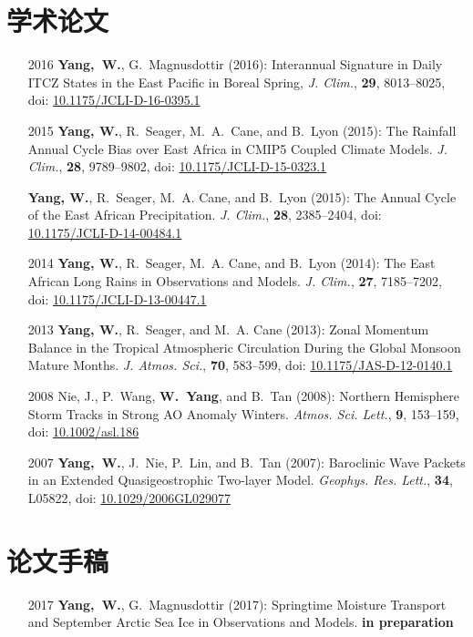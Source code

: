 \documentclass[11pt]{article}
\newcommand{\doi}[1]{ doi: \href{https://doi.org/#1}{#1} }
\begin{document}
\begin{CJK*}{UTF8}{gkai}
\section{学术论文}
\begin{itemize}[leftmargin=10ex,label={}, noitemsep, nolistsep]
	\item[2016] \textbf{Yang,~W.}, G.~Magnusdottir (2016): Interannual Signature in Daily ITCZ States in the East Pacific in Boreal Spring, \newblock \emph{J. Clim.},  \textbf{29}, 8013--8025, \doi{10.1175/JCLI-D-16-0395.1}
	
	\item[2015] \textbf{Yang, W.}, R.~Seager, M.~A.~Cane, and B.~Lyon (2015): The Rainfall Annual Cycle Bias over East Africa in CMIP5 Coupled Climate Models.
\newblock \emph{J. Clim.}, \textbf{28}, 9789--9802, \doi{10.1175/JCLI-D-15-0323.1}

	\item[] \textbf{Yang, W.}, R.~Seager, M.~A. Cane, and B.~Lyon (2015): The Annual Cycle of the
  East African Precipitation.
\newblock \emph{J. Clim.}, \textbf{28}, 2385--2404, \doi {10.1175/JCLI-D-14-00484.1}

	\item[2014] \textbf{Yang, W.}, R.~Seager, M.~A. Cane, and B.~Lyon (2014): The East African Long
  Rains in Observations and Models.
\newblock \emph{J. Clim.}, \textbf{27}, 7185--7202, \doi{10.1175/JCLI-D-13-00447.1}

	\item[2013] \textbf{Yang, W.}, R.~Seager, and M.~A. Cane (2013): Zonal Momentum Balance in the
  Tropical Atmospheric Circulation During the Global Monsoon Mature Months.
\newblock \emph{J. Atmos. Sci.}, \textbf{70}, 583--599, \doi{10.1175/JAS-D-12-0140.1}

	\item[2008] Nie, J., P.~Wang, \textbf{W.~Yang}, and B.~Tan (2008): Northern Hemisphere Storm Tracks
  in Strong AO Anomaly Winters.
\newblock \emph{Atmos. Sci. Lett.}, \textbf{9}, 153--159, \doi{10.1002/asl.186}

	\item[2007] \textbf{Yang,~W.}, J.~Nie, P.~Lin, and B.~Tan (2007): Baroclinic Wave Packets in an
  Extended Quasigeostrophic Two-layer Model.  \emph{Geophys. Res. Lett.}, \textbf{34}, L05822,  \doi{10.1029/2006GL029077}

\end{itemize}


\section{论文手稿}
\begin{itemize}[itemsep=0.3em,parsep=0pt, leftmargin=10ex]
	\item[2017] \textbf{Yang,~W.}, G.~Magnusdottir (2017): Springtime Moisture Transport and September Arctic Sea Ice in Observations and Models. \textbf{in preparation}
	

\end{itemize}
\end{CJK*}
\end{document}
